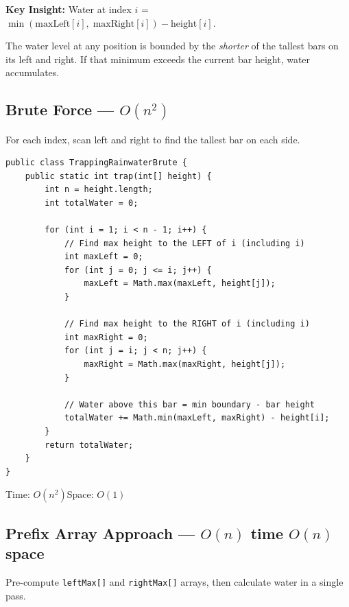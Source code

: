 \documentclass[12pt,a4paper,oneside]{book}
\begin{document}
\textbf{Key Insight:} Water at index $i$ = $\min(\text{maxLeft}[i],\; \text{maxRight}[i]) - \text{height}[i]$.

The water level at any position is bounded by the \textit{shorter} of the tallest bars on its left and right. If that minimum exceeds the current bar height, water accumulates.

\subsection{Brute Force --- $O(n^2)$}

For each index, scan left and right to find the tallest bar on each side.

\begin{lstlisting}[caption={Trapping Rainwater --- Brute Force O(n$^2$)}]
public class TrappingRainwaterBrute {
    public static int trap(int[] height) {
        int n = height.length;
        int totalWater = 0;

        for (int i = 1; i < n - 1; i++) {
            // Find max height to the LEFT of i (including i)
            int maxLeft = 0;
            for (int j = 0; j <= i; j++) {
                maxLeft = Math.max(maxLeft, height[j]);
            }

            // Find max height to the RIGHT of i (including i)
            int maxRight = 0;
            for (int j = i; j < n; j++) {
                maxRight = Math.max(maxRight, height[j]);
            }

            // Water above this bar = min boundary - bar height
            totalWater += Math.min(maxLeft, maxRight) - height[i];
        }
        return totalWater;
    }
}
\end{lstlisting}

\begin{complexity}
Time: $O(n^2)$\quad Space: $O(1)$
\end{complexity}

\subsection{Prefix Array Approach --- $O(n)$ time $O(n)$ space}

Pre-compute \texttt{leftMax[]} and \texttt{rightMax[]} arrays, then calculate water in a single pass.
\end{document}
